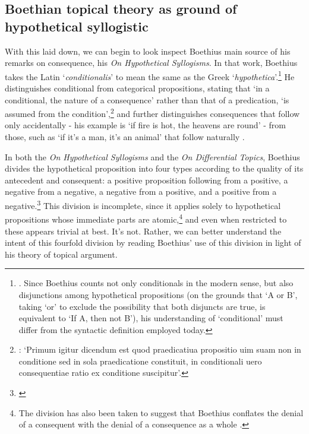 \documentclass[a4paper, 11pt]{article}
\begin{document}
\subsection{Boethian topical theory as ground of hypothetical syllogistic}
With this laid down, we can begin to look inspect Boethius main source of his remarks on consequence, his \emph{On Hypothetical Syllogisms}. In that work, Boethius takes the Latin `\emph{conditionalis}' to mean the same as the Greek `\emph{hypothetica}'.\footnote{\autocite[1.3.2]{BHS}. Since Boethius counts not only conditionals in the modern sense, 
	but also disjunctions among hypothetical propositions 
	(on the grounds that `A or B', taking `or' to exclude the possibility that both disjuncts are true, 
	is equivalent to `If A, then not B'), 
	his understanding of `conditional' must differ from the syntactic definition employed today.} 
He distinguishes conditional from categorical propositions, stating that `in a conditional, 
the nature of a consequence' rather than that of a predication, `is assumed from the condition',\footnote{\autocite[1.1.6]{BHS}: `Primum igitur dicendum est quod praedicatiua propositio uim suam non in conditione sed in sola praedicatione constituit, in conditionali uero consequentiae ratio ex conditione suscipitur'.} 
and further distinguishes consequences that follow only accidentally 
- his example is `if fire is hot, the heavens are round' - 
from those, such as `if it's a man, it's an animal' that follow naturally \autocite[1.3.6-1.3.7]{BHS}. 

In both the \emph{On Hypothetical Syllogisms} and the \emph{On Differential Topics}, 
Boethius divides the hypothetical proposition into four types according to the quality of its antecedent and consequent: 
a positive proposition following from a positive, 
a negative from a negative, 
a negative from a positive, 
and a positive from a negative.\footnote{\autocite[1.3.5]{BHS} \autocite[1176B-C]{BDT}} This division is incomplete, since it applies solely to hypothetical propositions whose immediate parts are atomic,\footnote{The division has also been taken to suggest that Boethius conflates the denial of a consequent with the denial of a consequence as a whole \autocite[157-158]{Martin2007}.} and even when restricted to these appears trivial at best. It's not. Rather, we can better understand the intent of this fourfold division by reading Boethius' use of this division in light of his theory of topical argument.
\end{document}
